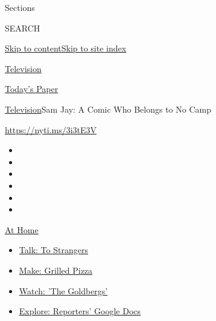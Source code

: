 Sections

SEARCH

\protect\hyperlink{site-content}{Skip to
content}\protect\hyperlink{site-index}{Skip to site index}

\href{https://www.nytimes3xbfgragh.onion/section/arts/television}{Television}

\href{https://myaccount.nytimes3xbfgragh.onion/auth/login?response_type=cookie\&client_id=vi}{}

\href{https://www.nytimes3xbfgragh.onion/section/todayspaper}{Today's
Paper}

\href{/section/arts/television}{Television}\textbar{}Sam Jay: A Comic
Who Belongs to No Camp

\url{https://nyti.ms/3i3tE3V}

\begin{itemize}
\item
\item
\item
\item
\item
\item
\end{itemize}

\href{https://www.nytimes3xbfgragh.onion/spotlight/at-home?action=click\&pgtype=Article\&state=default\&region=TOP_BANNER\&context=at_home_menu}{At
Home}

\begin{itemize}
\tightlist
\item
  \href{https://www.nytimes3xbfgragh.onion/2020/08/03/well/family/the-benefits-of-talking-to-strangers.html?action=click\&pgtype=Article\&state=default\&region=TOP_BANNER\&context=at_home_menu}{Talk:
  To Strangers}
\item
  \href{https://www.nytimes3xbfgragh.onion/2020/08/01/at-home/coronavirus-make-pizza-on-a-grill.html?action=click\&pgtype=Article\&state=default\&region=TOP_BANNER\&context=at_home_menu}{Make:
  Grilled Pizza}
\item
  \href{https://www.nytimes3xbfgragh.onion/2020/07/31/arts/television/goldbergs-abc-stream.html?action=click\&pgtype=Article\&state=default\&region=TOP_BANNER\&context=at_home_menu}{Watch:
  'The Goldbergs'}
\item
  \href{https://www.nytimes3xbfgragh.onion/interactive/2020/at-home/even-more-reporters-editors-diaries-lists-recommendations.html?action=click\&pgtype=Article\&state=default\&region=TOP_BANNER\&context=at_home_menu}{Explore:
  Reporters' Google Docs}
\end{itemize}

